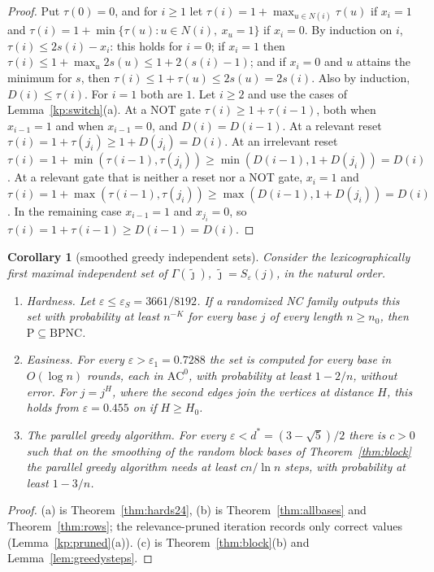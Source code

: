 \documentclass[11pt]{amsart}
\newtheorem{corollary}[theorem]{Corollary}
\theoremstyle{definition}
\theoremstyle{remark}
\newcommand{\eps}{\varepsilon}
\newcommand{\jt}{\tilde{\jmath}}
\begin{document}
\begin{proof}
Put $\tau(0)=0$, and for $i\ge1$ let $\tau(i)=1+\max_{u\in N(i)}\tau(u)$ if $x_i=1$ and
$\tau(i)=1+\min\{\tau(u):u\in N(i),\ x_u=1\}$ if $x_i=0$. By induction on $i$,
$\tau(i)\le2s(i)-x_i$: this holds for $i=0$; if $x_i=1$ then
$\tau(i)\le1+\max_u2s(u)\le1+2(s(i)-1)$; and if $x_i=0$ and $u$ attains the minimum for $s$, then
$\tau(i)\le1+\tau(u)\le2s(u)=2s(i)$. Also by induction, $D(i)\le\tau(i)$. For $i=1$ both are $1$.
Let $i\ge2$ and use the cases of Lemma~\ref{kp:switch}(a). At a NOT gate
$\tau(i)\ge1+\tau(i-1)$, both when $x_{i-1}=1$ and when $x_{i-1}=0$, and $D(i)=D(i-1)$. At a
relevant reset $\tau(i)=1+\tau(j_i)\ge1+D(j_i)=D(i)$. At an irrelevant reset
$\tau(i)=1+\min(\tau(i-1),\tau(j_i))\ge\min(D(i-1),1+D(j_i))=D(i)$. At a relevant gate that is
neither a reset nor a NOT gate, $x_i=1$ and
$\tau(i)=1+\max(\tau(i-1),\tau(j_i))\ge\max(D(i-1),1+D(j_i))=D(i)$. In the remaining case
$x_{i-1}=1$ and $x_{j_i}=0$, so $\tau(i)=1+\tau(i-1)\ge D(i-1)=D(i)$.
\end{proof}

\begin{corollary}[smoothed greedy independent sets]\label{cor:smoothedmis}
Consider the lexicographically first maximal independent set of $\Gamma(\jt)$,
$\jt=S_\eps(j)$, in the natural order.
\begin{enumerate}[label=(\alph*),leftmargin=2.4em]
\item \emph{Hardness.} Let $\eps\le\eps_S=3661/8192$. If a randomized NC family outputs this set
with probability at least $n^{-K}$ for every base $j$ of every length $n\ge n_0$, then
$\mathrm P\subseteq\mathrm{BPNC}$.
\item \emph{Easiness.} For every $\eps>\eps_1=0.7288$ the set is computed for every base in
$O(\log n)$ rounds, each in $\mathrm{AC}^0$, with probability at least $1-2/n$, without error.
For $j=j^H$, where the second edges join the vertices at distance $H$, this holds from
$\eps=0.455$ on if $H\ge H_0$.
\item \emph{The parallel greedy algorithm.} For every $\eps<d^*=(3-\sqrt5)/2$ there is $c>0$ such
that on the smoothing of the random block bases of Theorem~\ref{thm:block} the parallel greedy
algorithm needs at least $cn/\ln n$ steps, with probability at least $1-3/n$.
\end{enumerate}
\end{corollary}

\begin{proof}
(a) is Theorem~\ref{thm:hards24}, (b) is Theorem~\ref{thm:allbases} and Theorem~\ref{thm:rows};
the relevance-pruned iteration records only correct values (Lemma~\ref{kp:pruned}(a)). (c) is
Theorem~\ref{thm:block}(b) and Lemma~\ref{lem:greedysteps}.
\end{proof}
\end{document}
